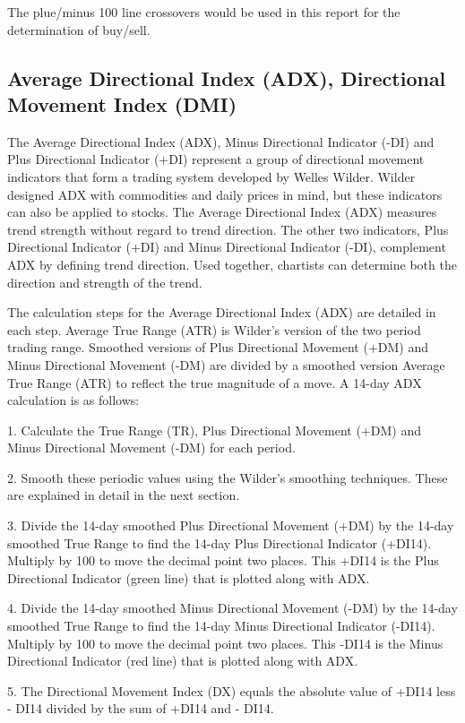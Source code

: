 The plue/minus 100 line crossovers would be used in this report for the determination of buy/sell.

\subsection{Average Directional Index (ADX), Directional Movement Index (DMI)}
The Average Directional Index (ADX), Minus Directional Indicator (-DI) and Plus Directional Indicator (+DI) represent a group of directional movement indicators that form a trading system developed by Welles Wilder. Wilder designed ADX with commodities and daily prices in mind, but these indicators can also be applied to stocks. The Average Directional Index (ADX) measures trend strength without regard to trend direction. The other two indicators, Plus Directional Indicator (+DI) and Minus Directional Indicator (-DI), complement ADX by defining trend direction. Used together, chartists can determine both the direction and strength of the trend.

The calculation steps for the Average Directional Index (ADX) are detailed in each step. Average True Range (ATR) is Wilder's version of the two period trading range. Smoothed versions of Plus Directional Movement (+DM) and Minus Directional Movement (-DM) are divided by a smoothed version Average True Range (ATR) to reflect the true magnitude of a move. A 14-day ADX calculation is as follows:

1. Calculate the True Range (TR), Plus Directional Movement (+DM) and Minus Directional Movement (-DM) for each period.

2. Smooth these periodic values using the Wilder's smoothing techniques. These are explained in detail in the next section.

3. Divide the 14-day smoothed Plus Directional Movement (+DM) by the 14-day smoothed True Range to find the 14-day Plus Directional Indicator (+DI14). Multiply by 100 to move the decimal point two places. This +DI14 is the Plus Directional Indicator (green line) that is plotted along with ADX.

4. Divide the 14-day smoothed Minus Directional Movement (-DM) by the 14-day smoothed True Range to find the 14-day Minus Directional Indicator (-DI14). Multiply by 100 to move the decimal point two places. This -DI14 is the Minus Directional Indicator (red line) that is plotted along with ADX.

5. The Directional Movement Index (DX) equals the absolute value of +DI14 less - DI14 divided by the sum of +DI14 and - DI14.

